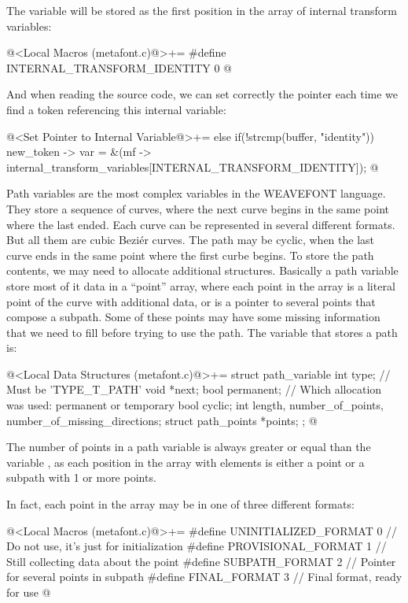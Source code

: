 The variable  will be stored as the first
position in the array of internal transform variables:

\iniciocodigo
@<Local Macros (metafont.c)@>+=
#define INTERNAL_TRANSFORM_IDENTITY 0
@
\fimcodigo

And when reading the source code, we can set correctly the pointer
each time we find a token referencing this internal variable:

\iniciocodigo
@<Set Pointer to Internal Variable@>+=
else if(!strcmp(buffer, "identity"))
  new_token -> var =
          &(mf -> internal_transform_variables[INTERNAL_TRANSFORM_IDENTITY]);
@
\fimcodigo



Path variables are the most complex variables in the WEAVEFONT
language. They store a sequence of curves, where the next curve begins
in the same point where the last ended. Each curve can be represented
in several different formats. But all them are cubic Beziér
curves. The path may be cyclic, when the last curve ends in the same
point where the first curbe begins. To store the path contents, we may
need to allocate additional structures. Basically a path variable
store most of it data in a ``point'' array, where each point in the
array is a literal point of the curve with additional data, or is a
pointer to several points that compose a subpath. Some of these points
may have some missing information that we need to fill before trying
to use the path. The variable that stores a path is:

\iniciocodigo
@<Local Data Structures (metafont.c)@>+=
struct path_variable{
  int type; // Must be 'TYPE_T_PATH'
  void *next;
  bool permanent; // Which allocation was used: permanent or temporary
  bool cyclic;
  int length, number_of_points, number_of_missing_directions;
  struct path_points *points;
};
@
\fimcodigo

The number of points in a path variable is always greater or equal
than the variable , as each position in the array
with  elements is either a point or a subpath with
1 or more points.

In fact, each point in the array may be in one of three different
formats:

\iniciocodigo
@<Local Macros (metafont.c)@>+=
#define UNINITIALIZED_FORMAT 0 // Do not use, it's just for initialization
#define PROVISIONAL_FORMAT   1 // Still collecting data about the point
#define SUBPATH_FORMAT       2 // Pointer for several points in subpath
#define FINAL_FORMAT         3 // Final format, ready for use
@
\fimcodigo

